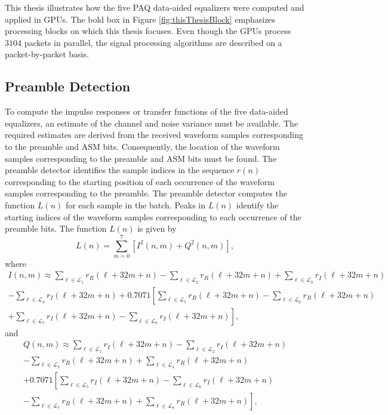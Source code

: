 This thesis illustrates how the five PAQ data-aided equalizers were computed and applied in GPUs.
The bold box in Figure \ref{fig:thisThesisBlock} emphasizes processing blocks on which this thesis focuses.
Even though the GPUs process $3104$ packets in parallel, the signal processing algorithms are described on a
packet-by-packet basis.

\subsection{Preamble Detection}
\label{sec:pd}
To compute the impulse responses or transfer functions of the five data-aided equalizers, an estimate of the channel and noise variance must be available.
The required estimates are derived from the received waveform samples corresponding to the preamble and ASM bits.
Consequently, the location of the waveform samples corresponding to the preamble and ASM bits must be found.
The preamble detector identifies the sample indices in the sequence $r(n)$ corresponding to the starting position of each occurrence of the waveform samples corresponding to the preamble.
The preamble detector computes the function $L(n)$ for each sample in the batch.
Peaks in $L(n)$ identify the starting indices of the waveform samples corresponding to each occurrence of the preamble bits.
The function $L(n)$ is given by \cite{preamble_detector}
\begin{equation}
	L(n) = \sum_{m=0}^{7}
		\left[ I^2(n,m) + Q^2(n,m) \right],
	\label{eq:gpu-L-4}
\end{equation}
where
\begin{multline}
	I(n,m) \approx \sum_{\ell\in\mathcal{L}_1}r_R(\ell+32m+n)
			- \sum_{\ell\in\mathcal{L}_2}r_R(\ell+32m+n)
			+ \sum_{\ell\in\mathcal{L}_3}r_I(\ell+32m+n)
			\\- \sum_{\ell\in\mathcal{L}_4}r_I(\ell+32m+n)
			+ 0.7071 \left[
				\sum_{\ell\in\mathcal{L}_5}r_R(\ell+32m+n)
				- \sum_{\ell\in\mathcal{L}_6}r_R(\ell+32m+n)
			\right. \\
			\left.
				+ \sum_{\ell\in\mathcal{L}_7}r_I(\ell+32m+n)
				- \sum_{\ell\in\mathcal{L}_8}r_I(\ell+32m+n)
			\right],
	\label{eq:gpu-L-pedone-geoghegan-2}
\end{multline}
and
\begin{multline}
	Q(n,m) \approx \sum_{\ell\in\mathcal{L}_1}r_I(\ell+32m+n)
			- \sum_{\ell\in\mathcal{L}_2}r_I(\ell+32m+n)
			\\
			- \sum_{\ell\in\mathcal{L}_3}r_R(\ell+32m+n)
			+ \sum_{\ell\in\mathcal{L}_4}r_R(\ell+32m+n)
			\\
			+ 0.7071 \left[
				\sum_{\ell\in\mathcal{L}_5}r_I(\ell+32m+n)
				- \sum_{\ell\in\mathcal{L}_6}r_I(\ell+32m+n)
			\right. \\
			\left.
				- \sum_{\ell\in\mathcal{L}_7}r_R(\ell+32m+n)
				+ \sum_{\ell\in\mathcal{L}_8}r_R(\ell+32m+n)
			\right],
		\label{eq:gpu-L-pedone-geoghegan-3}
\end{multline}
